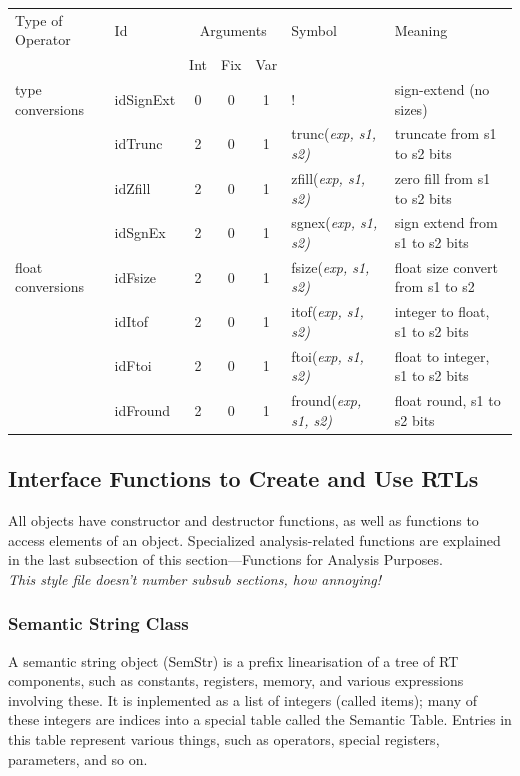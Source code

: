 \centerfigbegin
\begin{tabular}{|l|l|c|c|c|l|l|} \hline
Type of Operator & Id       &
\multicolumn{3}{c|}{Arguments}
& Symbol    & Meaning \\ \cline{3-5}
    &   & Int & Fix & Var & & \\
\hline
type conversions& idSignExt &0&0&1  & !         & sign-extend (no sizes) \\
            & idTrunc       &2&0&1  & trunc(\it{exp, s1, s2})& truncate from s1 to s2 bits \\
            & idZfill       &2&0&1  & zfill(\it{exp, s1, s2})& zero fill from s1 to s2 bits \\
            & idSgnEx       &2&0&1  & sgnex(\it{exp, s1, s2})& sign extend from s1 to s2 bits \\
\hline
float conversions&idFsize   &2&0&1  & fsize(\it{exp, s1, s2})& float size convert from s1 to s2 \\
            & idItof        &2&0&1  & itof(\it{exp, s1, s2})& integer to float, s1 to s2 bits \\
            & idFtoi        &2&0&1  & ftoi(\it{exp, s1, s2})& float to integer, s1 to s2 bits \\
            & idFround      &2&0&1  & fround(\it{exp, s1, s2})& float round, s1 to s2 bits \\
\hline
\end{tabular}

\subsection{Interface Functions to Create and Use RTLs}
All objects have constructor and destructor functions, as well
as functions to access elements of an object.  
Specialized analysis-related functions are explained in the
last subsection of this section---Functions for Analysis 
Purposes.  \\
{\it This style file doesn't number subsub sections,
how annoying! }


\subsubsection{Semantic String Class}
A semantic string object (SemStr) is a prefix linearisation of a tree
of RT components, such as constants, registers, memory, and various
expressions involving these. It is inplemented as a list of integers
(called items);
many of these integers are indices into a special table called the
Semantic Table. Entries in this table represent various things, such
as operators, special registers, parameters, and so on.


